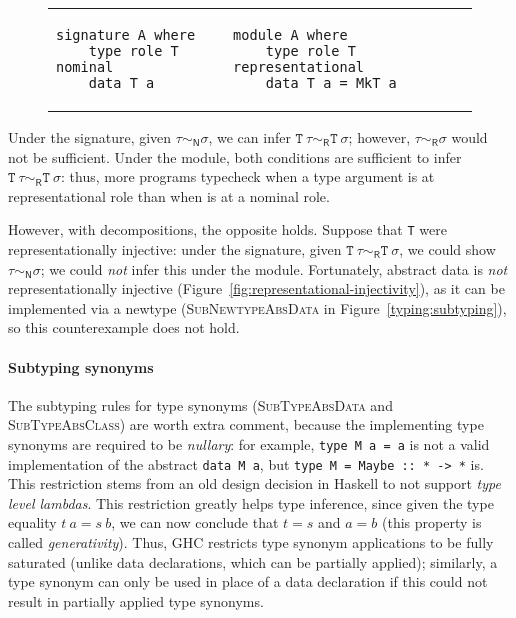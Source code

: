 \vspace{-1em}
\begin{figure}[H]
\begin{tabular}{p{} p{}}
\begin{lstlisting}
signature A where
    type role T nominal
    data T a
\end{lstlisting}
&
\begin{lstlisting}
module A where
    type role T representational
    data T a = MkT a
\end{lstlisting}
\end{tabular}
\end{figure}
\vspace{-1em}
%
\noindent
Under the signature, given $\tau \sim_\textsf{N} \sigma$, we can infer
$\texttt{T}~\tau \sim_\textsf{R} \texttt{T}~\sigma$; however,
$\tau \sim_\textsf{R} \sigma$ would not be sufficient.
Under the module, both conditions are sufficient to infer
$\texttt{T}~\tau \sim_\textsf{R} \texttt{T}~\sigma$: thus,
more programs typecheck when a type argument is at representational role
than when is at a nominal role.

However, with decompositions, the opposite holds. Suppose that \verb|T|
were representationally injective: under the signature, given
$\texttt{T}~\tau \sim_\textsf{R} \texttt{T}~\sigma$, we could
show $\tau \sim_\textsf{N} \sigma$; we could \emph{not} infer
this under the module.
Fortunately, abstract data is \emph{not}
representationally injective (Figure~\ref{fig:representational-injectivity}), as it can be implemented via
a newtype (\textsc{SubNewtypeAbsData} in Figure~\ref{typing:subtyping}),
so this counterexample does not hold.

\paragraph{Subtyping synonyms}
The subtyping rules for type synonyms (\textsc{SubTypeAbsData} and
\textsc{SubTypeAbsClass}) are worth extra comment, because the implementing
type synonyms are required to be \emph{nullary}: for example, \verb|type M a = a|
is not a valid implementation of the abstract \verb|data M a|,
but \verb|type M = Maybe :: * -> *| is.  This restriction
stems from an old design decision in Haskell to not support \emph{type level
lambdas}.  This restriction greatly helps type inference, since given the
type equality $t~a = s~b$, we can now conclude that $t = s$ and $a = b$
(this property is called \emph{generativity}).  Thus, GHC restricts type
synonym applications to be fully saturated (unlike data declarations, which can
be partially applied); similarly, a type synonym can only be used in place
of a data declaration if this could not result in partially applied type
synonyms.

